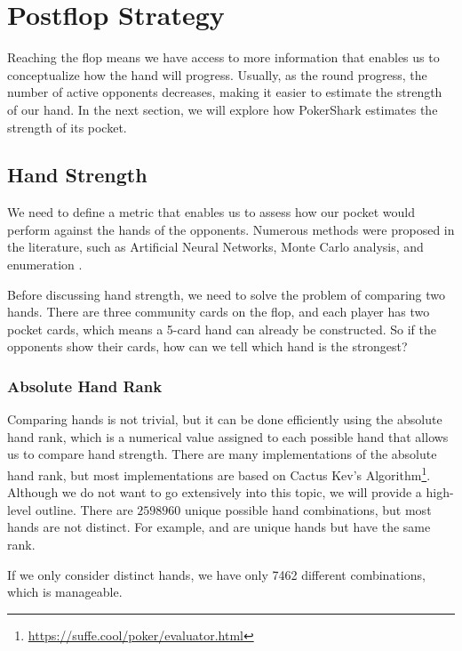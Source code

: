 \section{Postflop Strategy}
Reaching the flop means we have access to more information that enables us to conceptualize how the hand will progress. Usually, as the round progress, the number of active opponents decreases, making it easier to estimate the strength of our hand. In the next section, we will explore how PokerShark estimates the strength of its pocket.

\subsection{Hand Strength}
We need to define a metric that enables us to assess how our pocket would perform against the hands of the opponents. Numerous methods were proposed in the literature, such as Artificial Neural Networks\cite{bensson2013predicting}, Monte Carlo analysis, and enumeration \cite{billings_challenge_2002}.

Before discussing hand strength, we need to solve the problem of comparing two hands. There are three community cards on the flop, and each player has two pocket cards, which means a 5-card hand can already be constructed. So if the opponents show their cards, how can we tell which hand is the strongest?

\subsubsection{Absolute Hand Rank}
Comparing hands is not trivial, but it can be done efficiently using the absolute hand rank, which is a numerical value assigned to each possible hand that allows us to compare hand strength.
There are many implementations of the absolute hand rank, but most implementations are based on Cactus Kev's Algorithm\footnote{\url{https://suffe.cool/poker/evaluator.html}}. Although we do not want to go extensively into this topic, we will provide a high-level outline. There are $2598960$ unique possible hand combinations, but most hands are not distinct. For example,  and   are unique hands but have the same rank.

If we only consider distinct hands, we have only 7462 different combinations, which is manageable.

